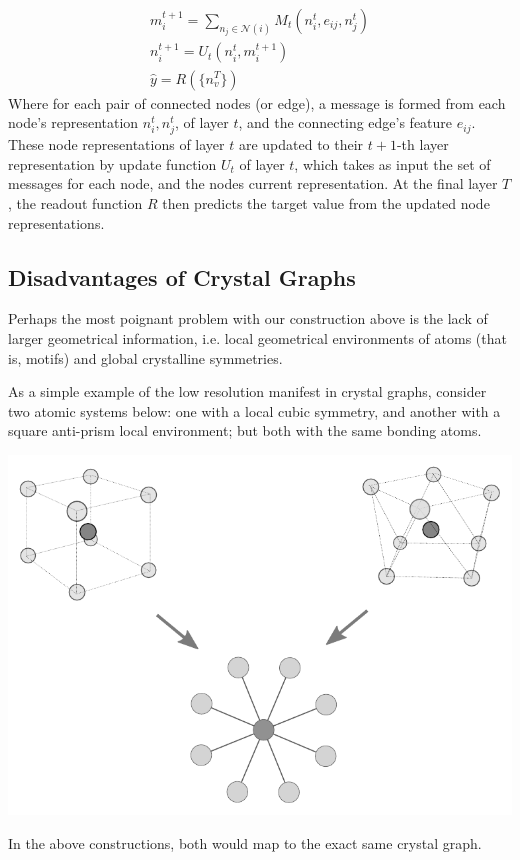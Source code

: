 \documentclass[10pt,a4paper]{article}
\begin{document}
\begin{gather*}
m_i^{t+1}=\sum_{n_j\in \mathcal{N}(i)} M_t(n_i^{t},e_{ij},n_j^t )\\
n_i^{t+1}=U_t(n_i^t,m_i^{t+1})\\
\hat{y}=R(\lbrace n_v^T\rbrace)
\end{gather*}
Where for each pair of connected nodes (or edge), a message is formed from each node's representation $n_i^t,n_j^t$, of layer $t$, and the connecting edge's feature $e_{ij}$. These  node representations of layer $t$ are updated to their $t+1$-th layer representation by update function $U_t$ of layer $t$, which takes as input the set of messages for each node, and the nodes current representation. At the final layer $T$, the readout function $R$ then predicts the target value from the updated node representations.

\subsection{Disadvantages of Crystal Graphs}
Perhaps the most poignant problem with our construction above is the lack of larger geometrical information, i.e. local geometrical environments of atoms (that is, motifs) and global crystalline symmetries.

As a simple example of the low resolution manifest in crystal graphs, consider two atomic systems below: one with a local cubic symmetry, and another with a square anti-prism local environment; but both with the same bonding atoms. 
\begin{center}
\includegraphics[scale=0.75]{crystalgraph_cntex.pdf}
\end{center}
In the above constructions, both would map to the exact same crystal graph.
\end{document}
